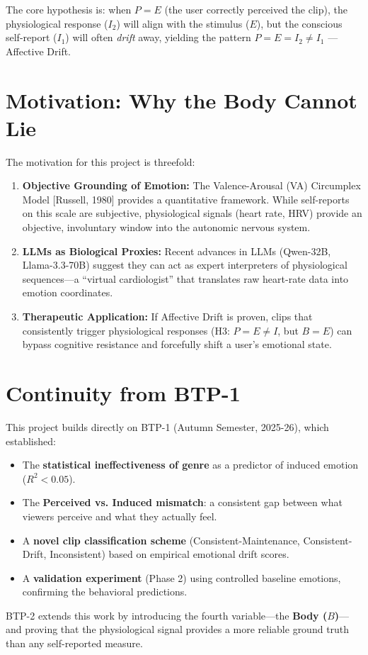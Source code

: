 \documentclass[11pt, a4paper]{report}
\begin{document}
The core hypothesis is: when $P = E$ (the user correctly perceived the clip), the physiological response ($I_2$) will align with the stimulus ($E$), but the conscious self-report ($I_1$) will often \textit{drift} away, yielding the pattern $P = E = I_2 \neq I_1$ --- Affective Drift.

\section{Motivation: Why the Body Cannot Lie}
The motivation for this project is threefold:
\begin{enumerate}
    \item \textbf{Objective Grounding of Emotion:} The Valence-Arousal (VA) Circumplex Model [Russell, 1980] provides a quantitative framework. While self-reports on this scale are subjective, physiological signals (heart rate, HRV) provide an objective, involuntary window into the autonomic nervous system.
    \item \textbf{LLMs as Biological Proxies:} Recent advances in LLMs (Qwen-32B, Llama-3.3-70B) suggest they can act as expert interpreters of physiological sequences---a ``virtual cardiologist'' that translates raw heart-rate data into emotion coordinates.
    \item \textbf{Therapeutic Application:} If Affective Drift is proven, clips that consistently trigger physiological responses (H3: $P = E \neq I$, but $B = E$) can bypass cognitive resistance and forcefully shift a user's emotional state.
\end{enumerate}

\section{Continuity from BTP-1}
This project builds directly on BTP-1 (Autumn Semester, 2025-26), which established:
\begin{itemize}
    \item The \textbf{statistical ineffectiveness of genre} as a predictor of induced emotion ($R^2 < 0.05$).
    \item The \textbf{Perceived vs. Induced mismatch}: a consistent gap between what viewers perceive and what they actually feel.
    \item A \textbf{novel clip classification scheme} (Consistent-Maintenance, Consistent-Drift, Inconsistent) based on empirical emotional drift scores.
    \item A \textbf{validation experiment} (Phase 2) using controlled baseline emotions, confirming the behavioral predictions.
\end{itemize}
BTP-2 extends this work by introducing the fourth variable---the \textbf{Body ($B$)}---and proving that the physiological signal provides a more reliable ground truth than any self-reported measure.
\end{document}
